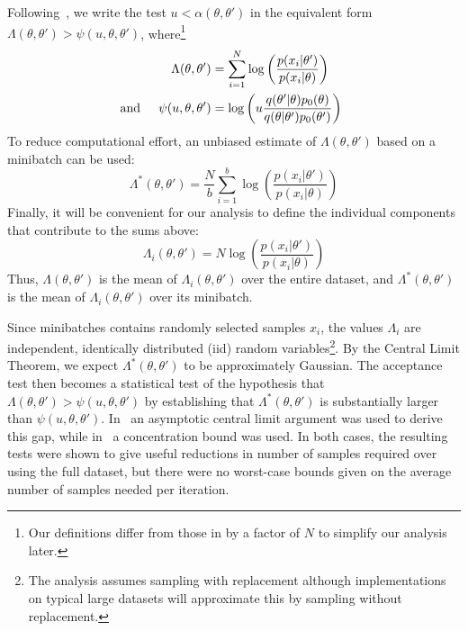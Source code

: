 \documentclass[twoside]{article} \usepackage{aistats2017}
\begin{document}
Following~\citet{icml2014c1_bardenet14}, we write the test $u <
\alpha(\theta,\theta')$ in the equivalent form $\Lambda(\theta,\theta') >
\psi(u,\theta,\theta')$, where\footnote{Our definitions differ from those in
\citet{icml2014c1_bardenet14} by a factor of $N$ to simplify our analysis later.}
\begin{equation}
\begin{split}
\Lambda(\theta,\theta') & = \sum_{i=1}^N \log\left(\frac{p(x_i|\theta')}{p(x_i|\theta)}\right)  
\hspace{0.2in} \\
{\rm and} \hspace{0.2in}
\psi(u,\theta,\theta') & = \log\left(u\frac{q(\theta'|\theta)p_0(\theta)}{q(\theta|\theta')p_0(\theta')}\right)
\end{split}
\end{equation}
To reduce computational effort, an unbiased estimate of $\Lambda(\theta,\theta')$
based on a minibatch can be used:
\begin{equation}
\Lambda^*(\theta,\theta') = \frac{N}{b}\sum_{i=1}^b \log\left(\frac{p(x_i|\theta')}{p(x_i|\theta)}\right)  
\end{equation}
Finally, it will be convenient for our analysis to define the individual
components that contribute to the sums above:
\begin{equation}\label{eq:individual_terms}
\Lambda_i(\theta,\theta') = N \log\left(\frac{p(x_i|\theta')}{p(x_i|\theta)}\right)  
\end{equation}
Thus, $\Lambda(\theta,\theta')$ is the mean of $\Lambda_i(\theta,\theta')$ over
the entire dataset, and $\Lambda^*(\theta,\theta')$ is the mean of
$\Lambda_i(\theta,\theta')$ over its minibatch. 

Since minibatches contains randomly selected samples $x_i$, the values
$\Lambda_i$ are independent, identically distributed (iid) random
variables\footnote{The analysis assumes sampling with replacement
although implementations on typical large datasets will approximate
this by sampling without replacement.}.
By the Central Limit Theorem, we expect $\Lambda^*(\theta,\theta')$ to
be approximately Gaussian. The acceptance test then becomes a
statistical test of the hypothesis that
$\Lambda(\theta,\theta')>\psi(u,\theta,\theta')$ by establishing that
$\Lambda^*(\theta,\theta')$ is substantially larger than
$\psi(u,\theta,\theta')$.  In~\citet{cutting_mh_2014} an asymptotic
central limit argument was used to derive this gap, while
in~\citet{icml2014c1_bardenet14} a concentration bound was used. In
both cases, the resulting tests were shown to give useful reductions
in number of samples required over using the full dataset, but there
were no worst-case bounds given on the average number of samples
needed per iteration.
\end{document}
